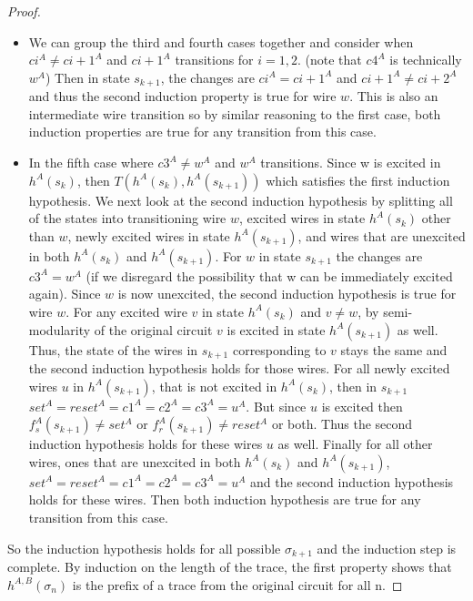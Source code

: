 \documentclass{article}
\begin{document}
\begin{proof}
\begin{itemize}
\item
We can group the third and fourth cases together and consider when $ci^{A}\neq ci+1^{A}$ and $ci+1^A$ transitions for $i=1,2$. (note that $c4^A$ is technically $w^A$)
Then in state $s_{k+1}$, the changes are $ci^A=ci+1^A$ and $ci+1^{A}\neq ci+2^{A}$ and thus the second induction property is true for wire $w$.  This is also an intermediate wire transition so by similar reasoning to the first case, both induction properties are true for any transition from this case.   
\item
In the fifth case where $c3^A\neq w^A$ and $w^A$ transitions.  Since w is excited in $h^A(s_k)$, then $T(h^A(s_k), h^A(s_{k+1}))$ which satisfies the first induction hypothesis.  We next look at the second induction hypothesis by splitting all of the states into transitioning wire $w$, excited wires in state $h^A(s_k)$ other than $w$, newly excited wires in state $h^A(s_{k+1})$, and wires that are unexcited in both $h^A(s_k)$ and $h^A(s_{k+1})$.  For $w$ in state $s_{k+1}$ the changes are $c3^{A}= w^{A}$ (if we disregard the possibility that w can be immediately excited again).  Since $w$ is now unexcited, the second induction hypothesis is true for wire $w$.  For any excited wire $v$ in state $h^A(s_k)$ and $v\neq w$, by semi-modularity of the original circuit $v$ is excited in state $h^A(s_{k+1})$ as well.  Thus, the state of the wires in $s_{k+1}$ corresponding to $v$ stays the same and the second induction hypothesis holds for those wires.  For all newly excited wires $u$ in $h^A(s_{k+1})$, that is not excited in $h^A(s_k)$, then in $s_{k+1}$  $set^A=reset^A=c1^A=c2^A=c3^A=u^A$.  But since $u$ is excited then $f_s^A(s_{k+1})\neq set^A$ or $f_r^A(s_{k+1})\neq reset^A$ or both.  Thus the second induction hypothesis holds for these wires $u$ as well.  Finally for all other wires, ones that are unexcited in both $h^A(s_k)$ and $h^A(s_{k+1})$, $set^A=reset^A=c1^A=c2^A=c3^A=u^A$ and the second induction hypothesis holds for these wires.  Then both induction hypothesis are true for any transition from this case. 
\end{itemize}
So the induction hypothesis holds for all possible $\sigma_{k+1}$ and the induction step is complete. \newline
By induction on the length of the trace, the first property shows that $h^{A,B}(\sigma_n)$ is the prefix of a trace from the original circuit for all n.


\end{proof}
\end{document}
